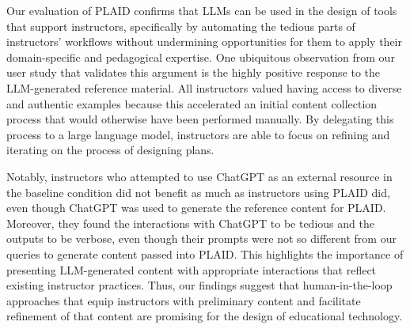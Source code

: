 Our evaluation of PLAID confirms that LLMs can be used in the design of tools that support instructors, specifically by automating the tedious parts of instructors' workflows without undermining opportunities for them to apply their domain-specific and pedagogical expertise. 
One ubiquitous observation from our user study that validates this argument is the 
highly positive response to the LLM-generated reference material. 
All instructors valued having access to diverse and authentic examples because this accelerated an initial content collection process that would otherwise have been performed manually. 
By delegating this process to a large language model, instructors are able to focus on refining and iterating on the process of designing plans. 

Notably, instructors who attempted to use ChatGPT as an external resource in the baseline condition did not benefit as much as instructors using PLAID did, even though ChatGPT was used to generate the reference content for PLAID. %
Moreover, they found the interactions with ChatGPT to be tedious and the outputs to be verbose, even though their prompts were not so different from our queries to generate content passed into PLAID.
This highlights the importance of presenting LLM-generated content with appropriate interactions that reflect existing instructor practices. 
Thus, our findings suggest that human-in-the-loop approaches that equip instructors with preliminary content and facilitate refinement of that content are promising for the design of educational technology. 


